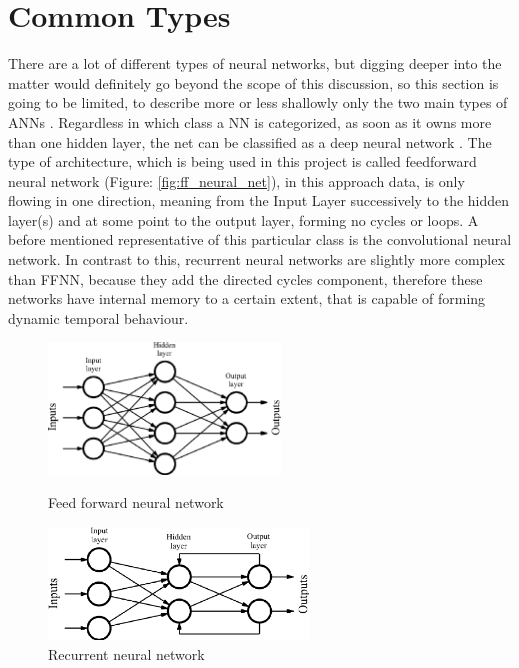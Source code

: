 \section{Common Types}
There are a lot of different types of neural networks, but digging deeper into the matter would definitely go beyond the scope of this discussion, so this section is going to be limited, to describe more or less shallowly only the two main types of ANNs \cite{nntutorial}. Regardless in which class a NN is categorized, as soon as it owns more than one hidden layer, the net can be classified as a deep neural network \cite{deep-learning-methods}. \newline
The type of architecture, which is being used in this project is called feedforward neural network (Figure: \ref{fig:ff_neural_net}), in this approach data, is only flowing in one direction, meaning from the Input Layer successively to the hidden layer(s) and at some point to the output layer, forming no cycles or loops. A before mentioned representative of this particular class is the convolutional neural network.\newline
In contrast to this, recurrent neural networks are slightly more complex than FFNN, because they add the directed cycles component, therefore these networks have internal memory to a certain extent, that is capable of forming dynamic temporal behaviour. 


\begin{figure}[H]
	
	\includegraphics[height=3.5cm]{images/feed_forward_neural_net.png}
	\caption{Feed forward neural network\protect\footnotemark}
	\label{fig:ff_neural_net}
	\endminipage
	\hfill
	\includegraphics[height=3cm]{images/recurrent_neural_net.png}
	\caption{Recurrent neural network\protect\footnotemark }
	\label{fig:rec_neural_net}
	\endminipage
	
\end{figure}
\setcounter{footnote}{3}
\setcounter{footnote}{4}

